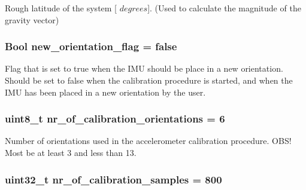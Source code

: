 \-Rough latitude of the system \mbox{[} $degrees$\mbox{]}. (\-Used to calculate the magnitude of the gravity vector) 

\hypertarget{group__nav__eq_ga9340627920ea2445fe1469547bc64eae}{
\subsubsection[{new\-\_\-orientation\-\_\-flag}]{\setlength{\rightskip}{0pt plus 5cm}\-Bool {\bf new\-\_\-orientation\-\_\-flag} = false}}
\label{group__nav__eq_ga9340627920ea2445fe1469547bc64eae}


\-Flag that is set to true when the \-I\-M\-U should be place in a new orientation. \-Should be set to false when the calibration procedure is started, and when the \-I\-M\-U has been placed in a new orientation by the user. 

\hypertarget{group__nav__eq_ga642a3ad33a0242f4e12fe46a13b0303f}{
\subsubsection[{nr\-\_\-of\-\_\-calibration\-\_\-orientations}]{\setlength{\rightskip}{0pt plus 5cm}uint8\-\_\-t {\bf nr\-\_\-of\-\_\-calibration\-\_\-orientations} = 6}}
\label{group__nav__eq_ga642a3ad33a0242f4e12fe46a13b0303f}


\-Number of orientations used in the accelerometer calibration procedure. \-O\-B\-S! \-Most be at least 3 and less than 13. 

\hypertarget{group__nav__eq_gab9d05ce5927a225127eff6993856da19}{
\subsubsection[{nr\-\_\-of\-\_\-calibration\-\_\-samples}]{\setlength{\rightskip}{0pt plus 5cm}uint32\-\_\-t {\bf nr\-\_\-of\-\_\-calibration\-\_\-samples} = 800}}
\label{group__nav__eq_gab9d05ce5927a225127eff6993856da19}


